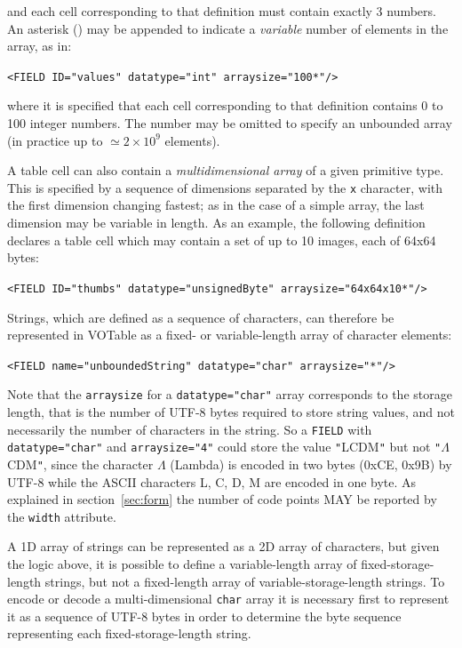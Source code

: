 \documentclass[11pt,a4paper]{ivoa}
\def\Aref#1{section~\ref{#1}}
\let\fg=\color
\def\slash {{\fg{blue}/}}
\def\attr#1{{\tt{\fg{DarkRed}#1}}}
\def\elem#1{{\tt{\fg{DarkRed}#1}}}
\def\attrval#1#2{{\tt{\fg{DarkRed}#1}="{\fg{DarkPurple}#2}"}}
\def\elemdef#1#2{{\tt\fg{blue}<}{\tt{\fg{DarkRed}#1}#2}{\tt\fg{blue}>}}
\def\literalvalue#1{{\tt"}{{\fg{DarkPurple}#1}}{\tt"}}
\begin{document}
\noindent and each cell corresponding to that definition must contain exactly
3 numbers. An asterisk ({\bf\tt*}) may be appended to indicate
a {\em variable} number of elements in the array, as in:

\elemdef{FIELD}{ \attrval{ID}{values} \attrval{datatype}{int}
   \attrval{arraysize}{100*}\slash}

\noindent where it is specified that each cell corresponding to that
  definition contains 0 to 100 integer numbers. The number may be
  omitted to specify an unbounded array
  (in practice up to $\simeq 2\times10^9$ elements).

A table cell can also contain a {\em multidimensional array}
of a given primitive type. This is specified by a sequence of dimensions
separated by the {\tt x} character,
with the first dimension changing fastest; as in the case
of a simple array, the last dimension may be variable in length.
As an example, the following definition
declares a table cell which may contain a set of up to 10 images,
each of 64x64 bytes:

\elemdef{FIELD}{ \attrval{ID}{thumbs} \attrval{datatype}{unsignedByte}
  \attrval{arraysize}{64x64x10*}\slash}

Strings, which are defined as a sequence of characters,
can therefore be represented in VOTable as a fixed- or variable-length
array of character elements:

\elemdef{FIELD}{ \attrval{name}{unboundedString} \attrval{datatype}{char}
       \attrval{arraysize}{*}\slash}

Note that the \attr{arraysize} for a \attrval{datatype}{char}
array corresponds to the storage length,
that is the number of UTF-8 bytes required to store string values,
and not necessarily the number of characters in the string.
So a \elem{FIELD} with \attrval{datatype}{char} and \attrval{arraysize}{4}
could store the value \literalvalue{LCDM}
but not \literalvalue{$\Lambda$CDM},
since the character $\Lambda$ (Lambda)
is encoded in two bytes (0xCE, 0x9B) by UTF-8
while the ASCII characters L, C, D, M are encoded in one byte.
As explained in \Aref{sec:form} the number of code points MAY
be reported by the \attr{width} attribute.

A 1D array of strings can be represented as a 2D array of characters, but
given the logic above, it is possible to define a variable-length array
of fixed-storage-length strings,
but not a fixed-length array of variable-storage-length strings.
To encode or decode a multi-dimensional {\tt char} array
it is necessary first to represent it as a sequence of UTF-8 bytes
in order to determine the byte sequence representing
each fixed-storage-length string.
\end{document}
